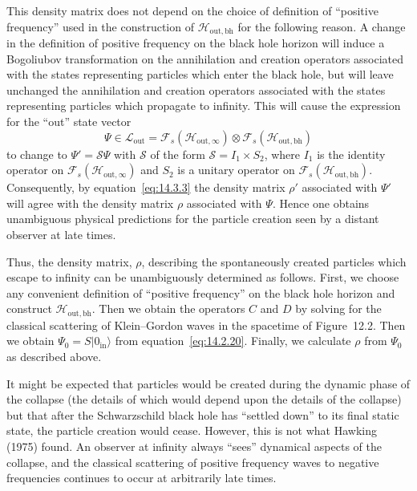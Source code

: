 This density matrix does not depend on the choice of definition of ``positive
frequency'' used in the construction of
\(\mathcal H_{\mathrm{out},\mathrm{bh}}\) for the following reason. A change in the
definition of positive frequency on the black hole horizon will induce a Bogoliubov
transformation on the annihilation and creation operators associated with the states
representing particles which enter the black hole, but will leave unchanged the
annihilation and creation operators associated with the states representing particles
which propagate to infinity. This will cause the expression for the ``out'' state vector
\[
  \Psi\in\mathcal L_{\mathrm{out}}
  =\mathcal F_s(\mathcal H_{\mathrm{out},\infty})\otimes
   \mathcal F_s(\mathcal H_{\mathrm{out},\mathrm{bh}})
\]
to change to \(\Psi'=\mathcal S\Psi\) with \(\mathcal S\) of the form
\(\mathcal S=I_1\times S_2\), where \(I_1\) is the identity operator on
\(\mathcal F_s(\mathcal H_{\mathrm{out},\infty})\) and \(S_2\) is a unitary
operator on \(\mathcal F_s(\mathcal H_{\mathrm{out},\mathrm{bh}})\).
Consequently, by equation~\eqref{eq:14.3.3} the density matrix \(\rho'\) associated
with \(\Psi'\) will agree with the density matrix \(\rho\) associated with \(\Psi\).
Hence one obtains unambiguous physical predictions for the particle creation seen
by a distant observer at late times.

Thus, the density matrix, \(\rho\), describing the spontaneously created particles
which escape to infinity can be unambiguously determined as follows. First, we
choose any convenient definition of ``positive frequency'' on the black hole horizon
and construct \(\mathcal H_{\mathrm{out},\mathrm{bh}}\). Then we obtain the
operators \(C\) and \(D\) by solving for the classical scattering of Klein--Gordon
waves in the spacetime of Figure~12.2. Then we obtain
\(\Psi_0=S\lvert0_{\mathrm{in}}\rangle\) from equation~\eqref{eq:14.2.20}.
Finally, we calculate \(\rho\) from \(\Psi_0\) as described above.

It might be expected that particles would be created during the dynamic phase of
the collapse (the details of which would depend upon the details of the collapse) but
that after the Schwarzschild black hole has ``settled down'' to its final static state,
the particle creation would cease. However, this is not what Hawking (1975) found.
An observer at infinity always ``sees'' dynamical aspects of the collapse, and the
classical scattering of positive frequency waves to negative frequencies continues
to occur at arbitrarily late times.

